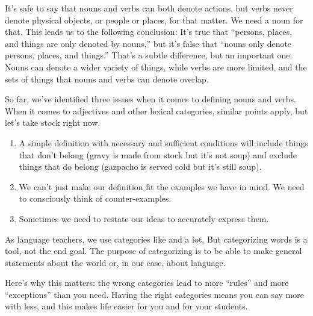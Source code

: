 \bigskip

It's safe to say that nouns and verbs can both denote actions, but verbs never denote physical objects, or people or places, for that matter. We need a noun for that. This leads us to the following conclusion:
\ea
    \ea It's true that \enquote{persons, places, and things are only denoted by nouns,} but
    \ex it's false that \enquote{nouns only denote persons, places, and things.}
    \z
\z
That's a subtle difference, but an important one. Nouns can denote a wider variety of things, while verbs are more limited, and the sets of things that nouns and verbs can denote overlap.

So far, we've identified three issues when it comes to defining nouns and verbs. When it comes to adjectives and other lexical categories, similar points apply, but let's take stock right now.
\begin{enumerate}[noitemsep]
    \item A simple definition with necessary and sufficient conditions will include things that don't belong (gravy is made from stock but it's not soup) and exclude things that do belong (gazpacho is served cold but it's still soup).
    \item We can't just make our definition fit the examples we have in mind. We need to consciously think of counter-examples.
    \item Sometimes we need to restate our ideas to accurately express them.
\end{enumerate}

As language teachers, we use categories like  and  a lot. But categorizing words is a tool, not the end goal. The purpose of categorizing is to be able to make general statements about the world or, in our case, about language.

Here's why this matters: the wrong categories lead to more \enquote{rules} and more \enquote{exceptions} than you need. Having the right categories means you can say more with less, and this makes life easier for you and for your students.

\bigskip

